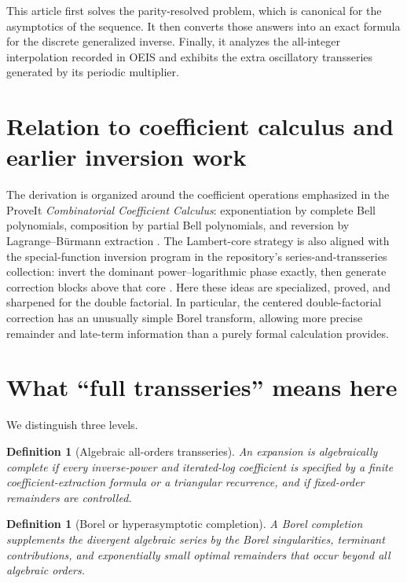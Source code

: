 \documentclass[11pt,a4paper,oneside]{book}
\newtheorem{definition}[theorem]{Definition}
\begin{document}
This article first solves the parity-resolved problem, which is canonical for
the asymptotics of the sequence.  It then converts those answers into an exact
formula for the discrete generalized inverse.  Finally, it analyzes the
all-integer interpolation recorded in OEIS and exhibits the extra oscillatory
transseries generated by its periodic multiplier.

\section{Relation to coefficient calculus and earlier inversion work}

The derivation is organized around the coefficient operations emphasized in
the ProveIt \emph{Combinatorial Coefficient Calculus}: exponentiation by complete
Bell polynomials, composition by partial Bell polynomials, and reversion by
Lagrange--B\"urmann extraction \cite{ProveIt-CCC}.  The Lambert-core strategy is
also aligned with the special-function inversion program in the repository's
series-and-transseries collection: invert the dominant power--logarithmic phase
exactly, then generate correction blocks above that core
\cite{ProveIt-Series,ProveIt-SpecialInverse}.  Here these ideas are specialized,
proved, and sharpened for the double factorial.  In particular, the centered
double-factorial correction has an unusually simple Borel transform, allowing
more precise remainder and late-term information than a purely formal
calculation provides.

\section{What ``full transseries'' means here}

We distinguish three levels.

\begin{definition}[Algebraic all-orders transseries]
An expansion is algebraically complete if every inverse-power and iterated-log
coefficient is specified by a finite coefficient-extraction formula or a
triangular recurrence, and if fixed-order remainders are controlled.
\end{definition}

\begin{definition}[Borel or hyperasymptotic completion]
A Borel completion supplements the divergent algebraic series by the Borel
singularities, terminant contributions, and exponentially small optimal
remainders that occur beyond all algebraic orders.
\end{definition}
\end{document}
